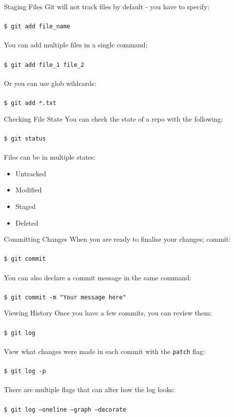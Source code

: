 \documentclass{beamer}
\begin{document}
\begin{frame}{Staging Files}
    Git will not track files by default - you have to specify: \\~\\
    {\tt \$ git add file\_name} \\~\\
    You can add multiple files in a single command: \\~\\
    {\tt \$ git add file\_1 file\_2} \\~\\
    Or you can use glob wildcards: \\~\\
    {\tt \$ git add *.txt}
\end{frame}

\begin{frame}{Checking File State}
    You can check the state of a repo with the following: \\~\\
    {\tt \$ git status} \\~\\
    Files can be in multiple states:
    \begin{itemize}
        \item Untracked
        \item Modified
        \item Staged
        \item Deleted
    \end{itemize}
\end{frame}

\begin{frame}{Committing Changes}
    When you are ready to finalise your changes; commit: \\~\\
    {\tt \$ git commit} \\~\\
    You can also declare a commit message in the same command: \\~\\
    {\tt \$ git commit -m "Your message here"}
\end{frame}

\begin{frame}{Viewing History}
    Once you have a few commits, you can review them:\\~\\
    {\tt \$ git log} \\~\\
    View what changes were made in each commit with the {\tt patch} flag: \\~\\
    {\tt \$ git log -p} \\~\\
    There are multiple flags that can alter how the log looks: \\~\\
    {\tt \$ git log --oneline --graph --decorate}
\end{frame}
\end{document}
